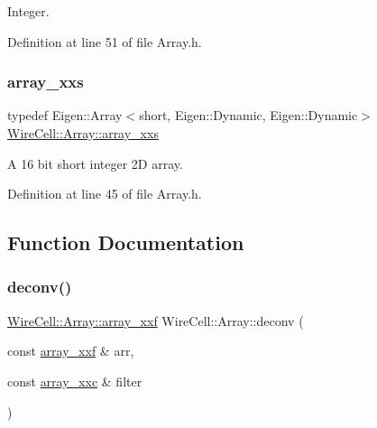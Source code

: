 Integer. 



Definition at line 51 of file Array.\+h.

\mbox{\label{namespace_wire_cell_1_1_array_a9cfeb4a60ab1746f8295d623c49e8cd4}} 
\subsubsection{\texorpdfstring{array\+\_\+xxs}{array\_xxs}}
{\footnotesize\ttfamily typedef Eigen\+::\+Array$<$short, Eigen\+::\+Dynamic, Eigen\+::\+Dynamic$>$ \hyperlink{namespace_wire_cell_1_1_array_a9cfeb4a60ab1746f8295d623c49e8cd4}{Wire\+Cell\+::\+Array\+::array\+\_\+xxs}}



A 16 bit short integer 2D array. 



Definition at line 45 of file Array.\+h.



\subsection{Function Documentation}
\mbox{\label{namespace_wire_cell_1_1_array_ae1c856168b5f280c3a5dfda8292124b4}} 
\subsubsection{\texorpdfstring{deconv()}{deconv()}}
{\footnotesize\ttfamily \hyperlink{namespace_wire_cell_1_1_array_ab565fef5e33632bb02f0ed4be803020c}{Wire\+Cell\+::\+Array\+::array\+\_\+xxf} Wire\+Cell\+::\+Array\+::deconv (\begin{DoxyParamCaption}\item[{const \hyperlink{namespace_wire_cell_1_1_array_ab565fef5e33632bb02f0ed4be803020c}{array\+\_\+xxf} \&}]{arr,  }\item[{const \hyperlink{namespace_wire_cell_1_1_array_a4688507545975422d74b9ba78530956a}{array\+\_\+xxc} \&}]{filter }\end{DoxyParamCaption})}

